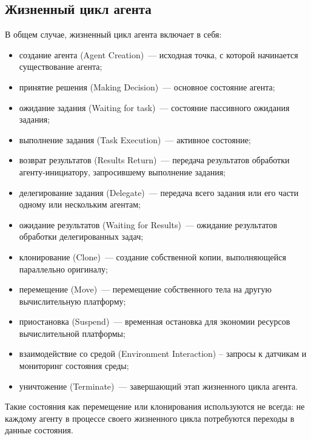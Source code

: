 \subsection{Жизненный цикл агента}
В общем случае, жизненный цикл агента включает в себя:
\begin{itemize}
\item создание агента (Agent Creation)~--- исходная точка, с которой начинается существование агента;
\item принятие решения (Making Decision)~--- основное состояние агента;
\item ожидание задания (Waiting for task)~--- состояние пассивного ожидания задания;
\item выполнение задания (Task Execution)~--- активное состояние;
\item возврат результатов (Results Return)~--- передача результатов обработки агенту-инициатору, запросившему выполнение задания;
\item делегирование задания (Delegate)~--- передача всего задания или его части одному или нескольким агентам;
\item ожидание результатов (Waiting for Results)~--- ожидание результатов обработки делегированных задач;
\item клонирование (Clone)~--- создание собственной копии, выполняющейся параллельно оригиналу;
\item перемещение (Move)~--- перемещение собственного тела на другую вычислительную платформу;
\item приостановка (Suspend)~--- временная остановка для экономии ресурсов вычислительной платформы;
\item взаимодействие со средой (Environment Interaction) – запросы к датчикам и мониторинг состояния среды;
\item уничтожение (Terminate)~--- завершающий этап жизненного цикла агента.
\end{itemize}

Такие состояния как перемещение или клонирования используются не всегда: не каждому агенту в процессе своего жизненного цикла потребуются переходы в данные состояния.


